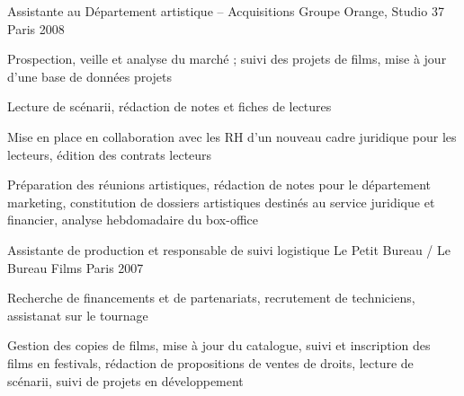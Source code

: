 \begin{cventries}
  \cventry
    {Assistante au Département artistique – Acquisitions} %
    {Groupe Orange, Studio 37} %
    {Paris} %
    {2008} %
    {
      \begin{cvitems} %
        \item {Prospection, veille et analyse du marché ; suivi des projets de films, mise à jour d’une base de données projets}
        \item {Lecture de scénarii, rédaction de notes et fiches de lectures}
        \item {Mise en place en collaboration avec les RH d’un nouveau cadre juridique pour les lecteurs, édition des contrats lecteurs}
        \item {Préparation des réunions artistiques, rédaction de notes pour le département marketing, constitution de dossiers artistiques destinés au service juridique et financier, analyse hebdomadaire du box-office}
      \end{cvitems}
    }

  \cventry
    {Assistante de production et responsable de suivi logistique} %
    {Le Petit Bureau / Le Bureau Films} %
    {Paris} %
    {2007} %
    {
      \begin{cvitems} %
        \item {Recherche de financements et de partenariats, recrutement de techniciens, assistanat sur le tournage}
        \item {Gestion des copies de films, mise à jour du catalogue, suivi et inscription des films en festivals, rédaction de propositions de ventes de droits, lecture de scénarii, suivi de projets en développement}
      \end{cvitems}
    }
\end{cventries}

